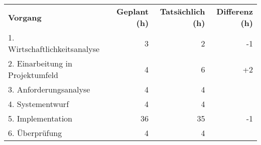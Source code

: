\begin{tabularx}{\textwidth}{Xrrr}
    \rowcolor{KVGruen}\textbf{Vorgang} & \textbf{Geplant (h)} & \textbf{Tatsächlich (h)} & \textbf{Differenz (h)} \\
    1. Wirtschaftlichkeitsanalyse & 3 & 2 & -1 \\
    \rowcolor{KVGrau}2. Einarbeitung in Projektumfeld & 4   & 6   & +2 \\
    3. Anforderungsanalyse & 4 & 4 & \\
    \rowcolor{KVGrau}4. Systementwurf & 4   & 4   &  \\
    5. Implementation & 36 & 35 & -1 \\
    \rowcolor{KVGrau}6. Überprüfung & 4   & 4  &  \\
\end{tabularx}
    
